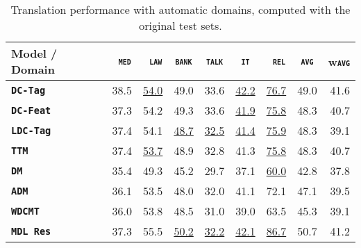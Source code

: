 \documentclass[11pt,a4paper]{article}
\newcommand{\fyDone}[1]{\done[FY]\Todo[FY:]{\textcolor{orange}{#1}}}
\newcommand{\domain}[1]{\texttt{\textsc{#1}}}
\newcommand{\system}[1]{\texttt{\textbf{#1}}}
\newcommand{\SB}[1]{\textbf{#1}}
\newcommand{\SW}[1]{\underline{#1}}
\begin{document}
\begin{table*}[t]
  \centering
  \fyDone{Fix column size}
  \begin{tabular}{|p{3cm}|*{8}{r|}} \hline
    Model / Domain & \multicolumn{1}{c|}{\domain{ med}} & \multicolumn{1}{c|}{\domain{ law}} & \multicolumn{1}{c|}{\domain{bank}} & \multicolumn{1}{c|}{\domain{talk}} & \multicolumn{1}{c|}{\domain{ it }} & \multicolumn{1}{c|}{\domain{ rel}} & \multicolumn{1}{c|}{\domain{avg}} & \multicolumn{1}{c||}{w\domain{avg}} \\ \hline %
    \system{DC-Tag}       & 38.5 & \SW{54.0} & 49.0   & 33.6 & \SW{42.2} & \SW{76.7} & 49.0 & 41.6 \\%
    \system{DC-Feat}      & 37.3  & 54.2 & 49.3   & 33.6 & \SW{41.9} & \SW{75.8} & 48.3 & 40.7  \\%
    \system{LDC-Tag}     & 37.4   & 54.1 & \SW{48.7} & \SW{32.5} & \SW{41.4} & \SW{75.9} & 48.3 & 39.1         \\%
    \system{TTM}            & 37.4 & \SW{53.7} & 48.9 & 32.8 & 41.3 & \SW{75.8} & 48.3 & 40.7   \\%
    \system{DM}             & 35.4 & 49.3  & 45.2 & 29.7 & 37.1 & \SW{60.0} & 42.8 & 37.8 \\ %
    \system{ADM}           & 36.1 & 53.5  & 48.0 & 32.0 & 41.1 & 72.1 & 47.1 & 39.5\\%
    \system{WDCMT}       & 36.0 & 53.8 & 48.5 & 31.0 & 39.0 & 63.5 & 45.3 & 39.1\\ %
    \system{MDL Res}     & 37.3 & 55.5  & \SW{50.2}   & \SW{32.2}   &  \SW{42.1}  & \SW{86.7} & 50.7& 41.2\\%
     \hline
  \end{tabular}
  \caption{Translation performance with automatic domains, computed with the original test sets.}
  \label{tab:subdomains}
  \fyDone{Fill the table with correct results,}
\end{table*}
\end{document}
